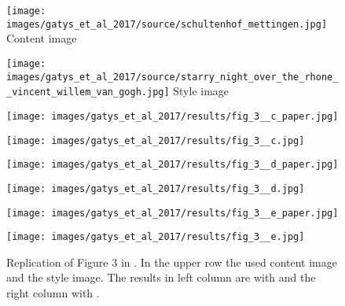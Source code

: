 \begin{figure}[H]
	\centering
	\begin{minipage}[t]{0.45\textwidth}
		\centering
		\texttt{[image: images/gatys\_et\_al\_2017/source/schultenhof\_mettingen.jpg]}
		Content image
	\end{minipage}
	\hfill%
	\begin{minipage}[t]{0.45\textwidth}
		\centering
		\texttt{[image: images/gatys\_et\_al\_2017/source/starry\_night\_over\_the\_rhone\_\_vincent\_willem\_van\_gogh.jpg]}
		Style image
	\end{minipage}
\hfill%
	\begin{minipage}[t]{0.45\textwidth}
		\centering
		\texttt{[image: images/gatys\_et\_al\_2017/results/fig\_3\_\_c\_paper.jpg]}
	\end{minipage}
	\hfill%
	\begin{minipage}[t]{0.45\textwidth}
		\centering
		\texttt{[image: images/gatys\_et\_al\_2017/results/fig\_3\_\_c.jpg]} 
	\end{minipage}
	\hfill%
	\begin{minipage}[t]{0.45\textwidth}
		\centering
		\texttt{[image: images/gatys\_et\_al\_2017/results/fig\_3\_\_d\_paper.jpg]} 
	\end{minipage}
	\hfill%
	\begin{minipage}[t]{0.45\textwidth}
		\centering
		\texttt{[image: images/gatys\_et\_al\_2017/results/fig\_3\_\_d.jpg]}
	\end{minipage}
	\hfill%
	\begin{minipage}[t]{0.45\textwidth}
		\centering
		\texttt{[image: images/gatys\_et\_al\_2017/results/fig\_3\_\_e\_paper.jpg]} 
	\end{minipage}
	\hfill%
	\begin{minipage}[t]{0.45\textwidth}
		\centering
		\texttt{[image: images/gatys\_et\_al\_2017/results/fig\_3\_\_e.jpg]}
	\end{minipage}
	\hfill%
\begin{minipage}[t]{0.45\textwidth}
	\centering
	\paper{}
\end{minipage}
\hfill%
\begin{minipage}[t]{0.45\textwidth}
	\centering
	\implementation{}
\end{minipage}
	\caption{Replication of Figure 3 in  \cite{GEB+2017}. In the upper row the used content image and the style image. The results in  left column are with \paper{} and the right column with \implementation{}.}
	\label{fig:GEB+2017_fig3}
\end{figure}

